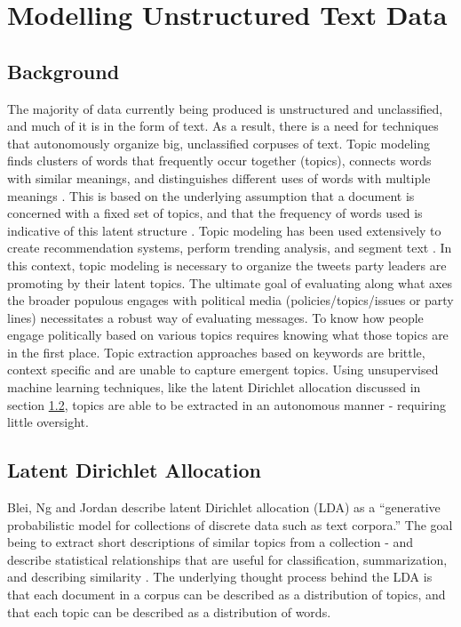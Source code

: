 \chapter{Modelling Unstructured Text Data}\label{ch:TopicModelling}

\section{Background}

The majority of data currently being produced is unstructured and unclassified,
and much of it is in the form of text. As a result, there is a need for
techniques that autonomously organize big, unclassified corpuses of text. Topic
modeling finds clusters of words that frequently occur together (topics),
connects words with similar meanings, and distinguishes different uses of words
with multiple meanings \cite{alghamdi2015survey}. This is based on the
underlying assumption that a document is concerned with a fixed set of topics,
and that the frequency of words used is indicative of this latent structure
\cite{blei2003latent}. Topic modeling has been used extensively to create
recommendation systems, perform trending analysis, and segment text
\cite{alghamdi2015survey}. In this context, topic modeling is necessary to
organize the tweets party leaders are promoting by their latent topics. The
ultimate goal of evaluating along what axes the broader populous engages with
political media (policies/topics/issues or party lines) necessitates a robust
way of evaluating messages. To know how people engage politically based on
various topics requires knowing what those topics are in the first place. Topic
extraction approaches based on keywords are brittle, context specific and are
unable to capture emergent topics. Using unsupervised machine learning
techniques, like the latent Dirichlet allocation discussed in section
\ref{sec:LDA}, topics are able to be extracted in an autonomous manner -
requiring little oversight.

\section{Latent Dirichlet Allocation}\label{sec:LDA}

Blei, Ng and Jordan describe latent Dirichlet allocation (LDA) as a “generative
probabilistic model for collections of discrete data such as text corpora.” The
goal being to extract short descriptions of similar topics from a collection -
and describe statistical relationships that are useful for classification,
summarization, and describing similarity \cite{blei2003latent}. The underlying
thought process behind the LDA is that each document in a corpus can be
described as a distribution of topics, and that each topic can be described as a
distribution of words. 

